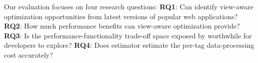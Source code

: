 
\label{sec:eva}
Our evaluation focuses on four research questions:
{\bf RQ1}: Can \Tool identify view-aware optimization opportunities from latest versions
    of popular web applications?
{\bf RQ2}: How much performance benefits can view-aware optimization provide?
{\bf RQ3}: Is the performance-functionality trade-off space exposed by \Tool worthwhile for developers to explore?
{\bf RQ4}: Does \Tool estimator estimate the per-tag data-processing cost accurately?
\begin{table}[t]											
\centering											
\caption{Opportunities detected by \Tool in 12 apps}												
\label{tab:oppo}										\centering
{}	
 \vspace{-0.1in}
\end{table}

